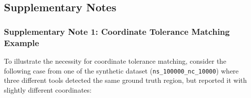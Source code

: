 \documentclass[
]{article}
\begin{document}
\subsection{Supplementary Notes}\label{supplementary-notes}

\subsubsection{Supplementary Note 1: Coordinate Tolerance Matching
Example}\label{note-supp-coord-tolerance}

To illustrate the necessity for coordinate tolerance matching, consider
the following case from one of the synthetic dataset
(\texttt{ns\_100000\_nc\_10000}) where three different tools detected
the same ground truth region, but reported it with slightly different
coordinates:
\end{document}
